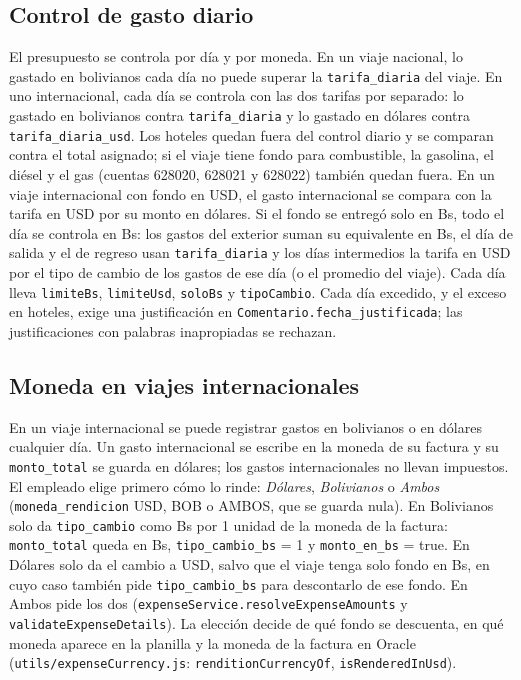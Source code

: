 \documentclass[11pt,letterpaper]{article}
\newcommand{\code}[1]{\nolinkurl{#1}}
\begin{document}
\subsection{Control de gasto diario}
El presupuesto se controla por día y por moneda. En un viaje nacional, lo gastado en bolivianos cada día no puede superar la \code{tarifa_diaria} del viaje. En uno internacional, cada día se controla con las dos tarifas por separado: lo gastado en bolivianos contra \code{tarifa_diaria} y lo gastado en dólares contra \code{tarifa_diaria_usd}. Los hoteles quedan fuera del control diario y se comparan contra el total asignado; si el viaje tiene fondo para combustible, la gasolina, el diésel y el gas (cuentas 628020, 628021 y 628022) también quedan fuera. En un viaje internacional con fondo en USD, el gasto internacional se compara con la tarifa en USD por su monto en dólares. Si el fondo se entregó solo en Bs, todo el día se controla en Bs: los gastos del exterior suman su equivalente en Bs, el día de salida y el de regreso usan \code{tarifa_diaria} y los días intermedios la tarifa en USD por el tipo de cambio de los gastos de ese día (o el promedio del viaje). Cada día lleva \code{limiteBs}, \code{limiteUsd}, \code{soloBs} y \code{tipoCambio}. Cada día excedido, y el exceso en hoteles, exige una justificación en \code{Comentario.fecha_justificada}; las justificaciones con palabras inapropiadas se rechazan.

\subsection{Moneda en viajes internacionales}
En un viaje internacional se puede registrar gastos en bolivianos o en dólares cualquier día. Un gasto internacional se escribe en la moneda de su factura y su \code{monto_total} se guarda en dólares; los gastos internacionales no llevan impuestos. El empleado elige primero cómo lo rinde: \emph{Dólares}, \emph{Bolivianos} o \emph{Ambos} (\code{moneda_rendicion} USD, BOB o AMBOS, que se guarda nula). En Bolivianos solo da \code{tipo_cambio} como Bs por 1 unidad de la moneda de la factura: \code{monto_total} queda en Bs, \code{tipo_cambio_bs} = 1 y \code{monto_en_bs} = true. En Dólares solo da el cambio a USD, salvo que el viaje tenga solo fondo en Bs, en cuyo caso también pide \code{tipo_cambio_bs} para descontarlo de ese fondo. En Ambos pide los dos (\code{expenseService.resolveExpenseAmounts} y \code{validateExpenseDetails}). La elección decide de qué fondo se descuenta, en qué moneda aparece en la planilla y la moneda de la factura en Oracle (\code{utils/expenseCurrency.js}: \code{renditionCurrencyOf}, \code{isRenderedInUsd}).
\end{document}
